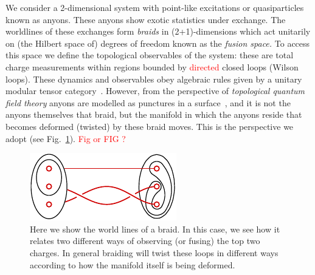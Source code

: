\documentclass[aps, prl, letterpaper, twocolumn, superscriptaddress, notitlepage, 10pt]{revtex4}
\newcommand{\Fref}[1]{Fig.~\ref{#1}}
\newcommand{\cggb}[1]{\textcolor{blue}{#1}}
\newcommand{\dude}[1]{\textcolor{red}{#1}}
\begin{document}
We consider a 
2-dimensional system with
point-like excitations or quasiparticles known as anyons.
These anyons show exotic statistics under exchange.
The worldlines of these exchanges form \emph{braids}
in (2+1)-dimensions
which act unitarily on (the Hilbert space of) degrees of freedom known as the \emph{fusion space.}
To access this space we define
the topological observables of the system: these
are total charge measurements within regions bounded by \dude{directed} closed loops (Wilson loops).
These dynamics and observables obey algebraic rules
given by a unitary modular tensor category~\cite{Wang2010b}. %
However, from the perspective of
\emph{topological quantum field theory}
anyons are modelled
as punctures in a surface~\cite{Pfeifer2014}, and it is not
the anyons themselves that braid,
but the manifold in which the anyons reside 
that becomes deformed (twisted) by these braid moves.
This is the perspective we adopt (see \Fref{f:braidloop}).
\dude{Fig or FIG ?}



\begin{figure}[t!]
\begin{center}
    \includegraphics[]{pic-braid-loop.pdf}
\caption{
Here we show the world lines of a braid.
In this case, we see how it relates two different ways of observing (or fusing) the top two charges.
In general braiding will twist these loops in different ways
according to how the manifold itself is being deformed.
\label{f:braidloop}
}
\end{center}
\vspace{-10pt}
\end{figure}
\end{document}
